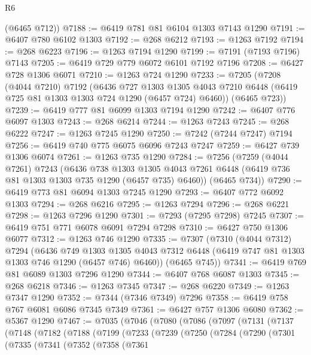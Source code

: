 \begin{lexlean}{R6}
\begin{coremodule}
      (@6465 @712))
@7188 := @6419 @781 @81 @6104 @1303 @7143 @1290
@7191 := @6407 @780 @6102 @1303
@7192 := @268 @6212
@7193 := @1263 @7192
@7194 := @268 @6223
@7196 := @1263 @7194 @1290
@7199 := @7191 (@7193 @7196) @7143
@7205 := @6419 @729 @779 @6072 @6101 @7192 @7196
@7208 := @6427 @728 @1306 @6071
@7210 := @1263 @724 @1290
@7233 := @7205
    (@7208
      (@4044 @7210)
      @7192
      (@6436
        @727
        @1303
        @1305
        @4043
        @7210
        @6448
        (@6419 @725 @81 @1303 @1303 @724 @1290 (@6457 @724) @6460))
      (@6465 @723))
@7239 := @6419 @777 @81 @6099 @1303 @7194 @1290
@7242 := @6407 @776 @6097 @1303
@7243 := @268 @6214
@7244 := @1263 @7243
@7245 := @268 @6222
@7247 := @1263 @7245 @1290
@7250 := @7242 (@7244 @7247) @7194
@7256 := @6419 @740 @775 @6075 @6096 @7243 @7247
@7259 := @6427 @739 @1306 @6074
@7261 := @1263 @735 @1290
@7284 := @7256
    (@7259
      (@4044 @7261)
      @7243
      (@6436
        @738
        @1303
        @1305
        @4043
        @7261
        @6448
        (@6419 @736 @81 @1303 @1303 @735 @1290 (@6457 @735) @6460))
      (@6465 @734))
@7290 := @6419 @773 @81 @6094 @1303 @7245 @1290
@7293 := @6407 @772 @6092 @1303
@7294 := @268 @6216
@7295 := @1263 @7294
@7296 := @268 @6221
@7298 := @1263 @7296 @1290
@7301 := @7293 (@7295 @7298) @7245
@7307 := @6419 @751 @771 @6078 @6091 @7294 @7298
@7310 := @6427 @750 @1306 @6077
@7312 := @1263 @746 @1290
@7335 := @7307
    (@7310
      (@4044 @7312)
      @7294
      (@6436
        @749
        @1303
        @1305
        @4043
        @7312
        @6448
        (@6419 @747 @81 @1303 @1303 @746 @1290 (@6457 @746) @6460))
      (@6465 @745))
@7341 := @6419 @769 @81 @6089 @1303 @7296 @1290
@7344 := @6407 @768 @6087 @1303
@7345 := @268 @6218
@7346 := @1263 @7345
@7347 := @268 @6220
@7349 := @1263 @7347 @1290
@7352 := @7344 (@7346 @7349) @7296
@7358 := @6419 @758 @767 @6081 @6086 @7345 @7349
@7361 := @6427 @757 @1306 @6080
@7362 := @5367 @1290
@7467 := @7035
    (@7046
      (@7080
        (@7086
          (@7097
            (@7131
              (@7137
                (@7148
                  (@7182
                    (@7188
                      (@7199
                        (@7233
                          (@7239
                            (@7250
                              (@7284
                                (@7290
                                  (@7301
                                    (@7335
                                      (@7341
                                        (@7352
                                          (@7358
                                            (@7361

\end{coremodule}
\end{lexlean}
